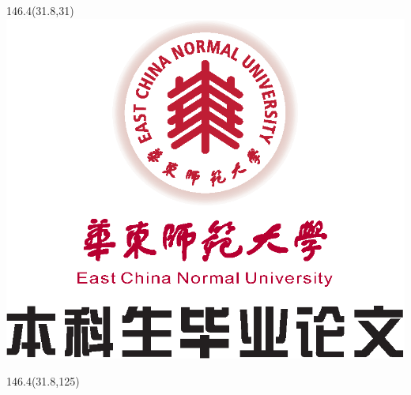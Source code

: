 
\thispagestyle{empty}
\begin{titlepage}
	\captionsetup{belowskip=0pt}
%	
	\renewcommand{\ULthickness}{1.2pt}
	\begin{center}\noindent \bfseries {}\end{center}
	
	\begin{textblock}{146.4}(31.8,31)
		\centering
		\includegraphics{./figures/inner-cover(contains_font).eps}
	\end{textblock}
	
	\begin{textblock}{146.4}(31.8,125)
		\noindent
		\begin{minipage}[t][8.2cm][c]{\linewidth}
			\begin{center}
				\noindent\textbf{\zihao{2}{\rmfamily{\expandafter\expandafter{\TitleCHS}}}}
			\end{center}
			\begin{center}
				\noindent\textbf{\zihao{2}{\rmfamily{\expandafter\expandafter{\TitleENG}}}}
			\end{center}
		\end{minipage}
	\end{textblock}
	
	\renewcommand{\ULthickness}{0.4pt}
	

\end{titlepage}
